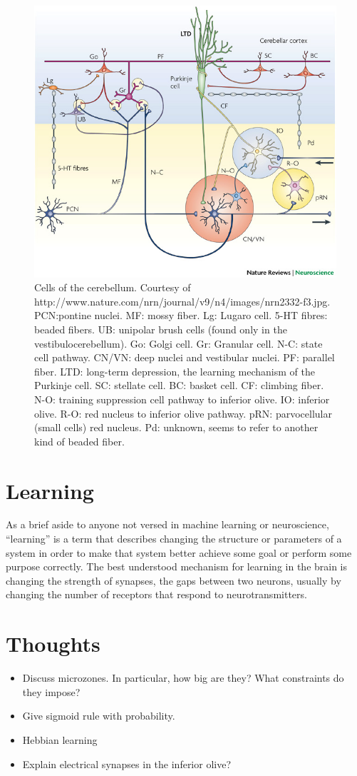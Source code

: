 \documentclass{article}
\theoremstyle{definition}
\begin{document}
\begin{figure}
\includegraphics[width=\linewidth]{nanohub/nature.png}
\caption{Cells of the cerebellum. Courtesy of
  http://www.nature.com/nrn/journal/v9/n4/images/nrn2332-f3.jpg.
PCN:pontine nuclei.
MF: mossy fiber.
Lg: Lugaro cell.
5-HT fibres: beaded fibers.
UB: unipolar brush cells (found only in the vestibulocerebellum).
Go: Golgi cell.
Gr: Granular cell.
N-C: state cell pathway.
CN/VN: deep nuclei and vestibular nuclei.
PF: parallel fiber.
LTD: long-term depression, the learning mechanism of the Purkinje cell.
SC: stellate cell.
BC: basket cell.
CF: climbing fiber.
N-O: training suppression cell pathway to inferior olive.
IO: inferior olive.
R-O: red nucleus to inferior olive pathway.
pRN: parvocellular (small cells) red nucleus. 
Pd: unknown, seems to refer to another kind of beaded fiber.
}
\label{fig-physical-4}
\end{figure}


\section{Learning}

As a brief aside to anyone not versed in machine learning or neuroscience,
``learning'' is a term that describes changing the structure or parameters of a
system in order to make that system better achieve some goal or perform some
purpose correctly. The best understood mechanism for learning in the brain is
changing the strength of synapses, the gaps between two neurons, usually by
changing the number of receptors that respond to neurotransmitters.

\section{Thoughts}

\begin{itemize}
\item Discuss microzones. In particular, how big are they? What
  constraints do they impose?
\item Give sigmoid rule with probability.

\item Hebbian learning

\item Explain electrical synapses in the inferior olive?
\end{itemize}
\end{document}
